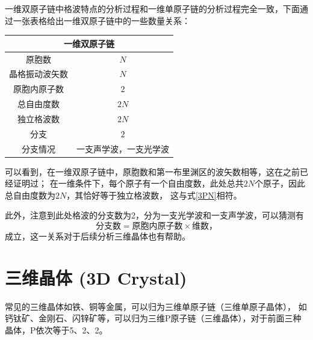 \documentclass[declarePage]{ecnuthesis}
\begin{document}
一维双原子链中格波特点的分析过程和一维单原子链的分析过程完全一致，下面通过一张表格给出一维双原子链中的一些数量关系：
\begin{table}[htb]
    \centering
    \begin{tabular}{|c|c|}
        \hline
        \multicolumn{2}{|c|}{一维双原子链}     \\ 
        \hline
        原胞数         & $N$                   \\ 
        \hline
        晶格振动波矢数 & $N$                   \\ 
        \hline
        原胞内原子数   & $2$                   \\ 
        \hline
        总自由度数     & $2N$                  \\ 
        \hline
        独立格波数     & $2N$                  \\ 
        \hline
        分支           & $2$                   \\ 
        \hline
        分支情况       & 一支声学波，一支光学波\\ 
        \hline
    \end{tabular}
\end{table}

可以看到，在一维双原子链中，原胞数和第一布里渊区的波矢数相等，这在之前已经证明过；%
在一维条件下，每个原子有一个自由度数，此处总共$2N$个原子，因此总自由度数为$2N$，其恰好等于独立格波数，%
这与式\ref{3PN}相符。

此外，注意到此处格波的分支数为2，分为一支光学波和一支声学波，可以猜测有
\begin{equation}
    \text{分支数} = \text{原胞内原子数} \times \text{维数，} \label{Bran}
\end{equation}
成立，这一关系对于后续分析三维晶体也有帮助。

\newpage

\section{三维晶体 (3D Crystal)}

常见的三维晶体如铁、铜等金属，可以归为三维单原子链（三维单原子晶体），%
如钙钛矿、金刚石、闪锌矿等，可以归为三维P原子链（三维晶体），对于前面三种晶体，P依次等于5、2、2。
\end{document}
